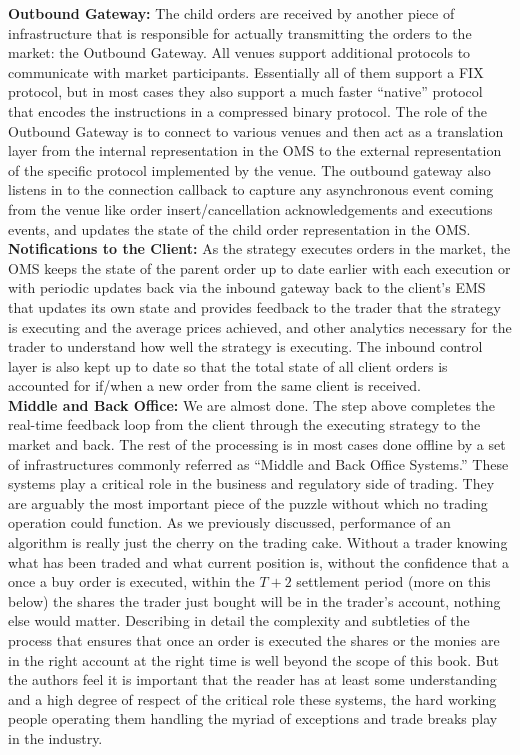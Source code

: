 \noindent\textbf{Outbound Gateway:} The child orders are received by another piece of infrastructure that is responsible for actually transmitting the orders to the market: the Outbound Gateway. All venues support additional protocols to communicate with market participants. Essentially all of them support a FIX protocol, but in most cases they also support a much faster ``native'' protocol that encodes the instructions in a compressed binary protocol. The role of the Outbound Gateway is to connect to various venues and then act as a translation layer from the internal representation in the OMS to the external representation of the specific protocol implemented by the venue. The outbound gateway also listens in to the connection callback to capture any asynchronous event coming from the venue like order insert/cancellation acknowledgements and executions events, and updates the state of the child order representation in the OMS. \\


\noindent\textbf{Notifications to the Client:} As the strategy executes orders in the market, the OMS keeps the state of the parent order up to date earlier with each execution or with periodic updates back via the inbound gateway back to the client's EMS that updates its own state and provides feedback to the trader that the strategy is executing and the average prices achieved, and other analytics necessary for the trader to understand how well the strategy is executing. The inbound control layer is also kept up to date so that the total state of all client orders is accounted for if/when a new order from the same client is received. \\


\noindent\textbf{Middle and Back Office:} We are almost done. The step above completes the real-time feedback loop from the client through the executing strategy to the market and back. The rest of the processing is in most cases done offline by a set of infrastructures commonly referred as ``Middle and Back Office Systems.'' These systems play a critical role in the business and regulatory side of trading. They are arguably the most important piece of the puzzle without which no trading operation could function. As we previously discussed, performance of an algorithm is really just the cherry on the trading cake. Without a trader knowing what has been traded and what current position is, without the confidence that a once a buy order is executed, within the $T+2$ settlement period (more on this below) the shares the trader just bought will be in the trader's account, nothing else would matter. Describing in detail the complexity and subtleties of the process that ensures that once an order is executed the shares or the monies are in the right account at the right time is well beyond the scope of this book. But the authors feel it is important that the reader has at least some understanding and a high degree of respect of the critical role these systems, the hard working people operating them handling the myriad of exceptions and trade breaks play in the industry.



